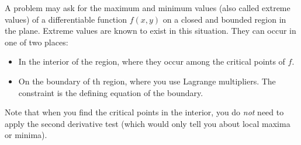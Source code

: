 \begin{fact}
	A problem may ask for the maximum and minimum values (also called extreme
	values) of a differentiable function $f(x, y)$ on a closed and bounded region
	in the plane. Extreme values are known to exist in this situation. They can
	occur in one of two places:
	\begin{itemize}
		\item In the interior of the region, where they occur among the critical
			points of $f$.
		\item On the boundary of th region, where you use Lagrange multipliers. The
			constraint is the defining equation of the boundary.
	\end{itemize}
	Note that when you find the critical points in the interior, you do \emph{not}
	need to apply the second derivative test (which would only tell you about
	local maxima or minima).
\end{fact}
